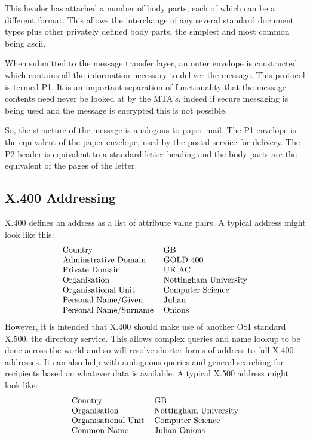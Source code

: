 This header has attached a number of body parts, each of which can be
a different format. This allows the interchange of any several
standard document types plus other privately defined body parts, the
simplest and most common being ascii.

When submitted to the message transfer layer, an outer envelope is
constructed which contains all the information necessary to deliver
the message. This protocol is termed P1. It is an important separation
of functionality that the message contents need never be looked at by
the MTA's, indeed if secure messaging is being used and the message is
encrypted this is not possible.

So, the structure of the message is analogous to paper mail. The P1
envelope is the equivalent of the paper envelope, used by the postal
service for delivery. The P2 header is equivalent to a standard letter
heading and the body parts are the equivalent of the pages of the
letter.

\subsection{X.400 Addressing}

X.400 defines an address as a list of attribute value pairs.  A
typical address might look like this:
\[\begin{tabular}{l l}
Country&		GB\\
Adminstrative Domain&	GOLD 400\\
Private Domain&		UK.AC\\
Organisation&		Nottingham University\\
Organisational Unit&	Computer Science\\
Personal Name/Given&	Julian\\
Personal Name/Surname&	Onions\\
\end{tabular}\]
However, it is intended that X.400 should make use of another OSI
standard X.500, the directory service. This allows complex queries and
name lookup to be done across the world and so will resolve shorter
forms of address to full X.400 addresses. It can also help with
ambiguous queries and general searching for recipients based on
whatever data is available. A typical X.500 address might look like:
\[\begin{tabular}{l l}
Country&		GB\\
Organisation&		Nottingham University\\
Organisational Unit&	Computer Science\\
Common Name&		Julian Onions\\
\end{tabular}\]

